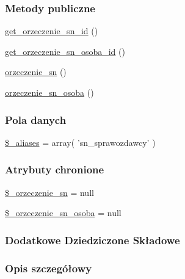 \subsubsection*{Metody publiczne}
\begin{DoxyCompactItemize}
\item 
\hyperlink{classsp___orzeczenie___s_n___sprawozdawca_a48819f0e56cb11707ba89150dd449c71}{get\-\_\-orzeczenie\-\_\-sn\-\_\-id} ()
\item 
\hyperlink{classsp___orzeczenie___s_n___sprawozdawca_a8a91a727290a24c4f12d72adda38d3df}{get\-\_\-orzeczenie\-\_\-sn\-\_\-osoba\-\_\-id} ()
\item 
\hyperlink{classsp___orzeczenie___s_n___sprawozdawca_ad3ca9a024234af7b90b52e8edb3406ff}{orzeczenie\-\_\-sn} ()
\item 
\hyperlink{classsp___orzeczenie___s_n___sprawozdawca_abedbfb98ce259de97cc4ddfd5496797c}{orzeczenie\-\_\-sn\-\_\-osoba} ()
\end{DoxyCompactItemize}
\subsubsection*{Pola danych}
\begin{DoxyCompactItemize}
\item 
\hyperlink{classsp___orzeczenie___s_n___sprawozdawca_ab4e31d75f0bc5d512456911e5d01366b}{\$\-\_\-aliases} = array( 'sn\-\_\-sprawozdawcy' )
\end{DoxyCompactItemize}
\subsubsection*{Atrybuty chronione}
\begin{DoxyCompactItemize}
\item 
\hyperlink{classsp___orzeczenie___s_n___sprawozdawca_a03da9aa4f10fbe1d2b4ef32521cbedb0}{\$\-\_\-orzeczenie\-\_\-sn} = null
\item 
\hyperlink{classsp___orzeczenie___s_n___sprawozdawca_a9ede817d229955b98ebe3e10f5a45e94}{\$\-\_\-orzeczenie\-\_\-sn\-\_\-osoba} = null
\end{DoxyCompactItemize}
\subsubsection*{Dodatkowe Dziedziczone Składowe}


\subsubsection{Opis szczegółowy}


